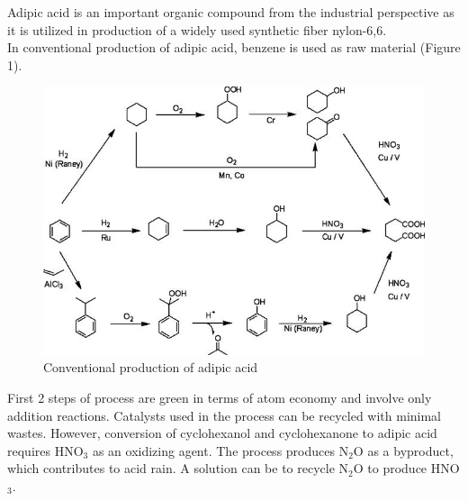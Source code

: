 \documentclass[pdftex,12pt,a4paper]{article}
\begin{document}
Adipic acid is an important organic compound from the industrial perspective as it is utilized in production of a widely used synthetic fiber nylon-6,6.\\
In conventional production of adipic acid, benzene is used as raw material (Figure 1).
\begin{figure}
\centering
\includegraphics[clip=true,trim=0pt 0pt 0pt 0pt,scale=0.5]{25febi1.jpg}
\caption{Conventional production of adipic acid}
\end{figure}
First 2 steps of process are green in terms of atom economy and involve only addition reactions. Catalysts used in the process can be recycled with minimal wastes. However, conversion of cyclohexanol and cyclohexanone to adipic acid requires HNO$_3$ as an oxidizing agent. The process produces N$_2$O as a byproduct, which contributes to acid rain. A solution can be to recycle N$_2$O to produce HNO$_3$.\\
\end{document}
